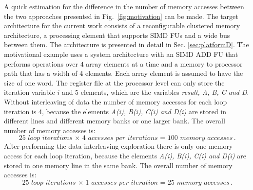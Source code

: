A quick estimation for the difference in the number of memory accesses between the two approaches presented in Fig.~\ref{fig:motivation} can be made.
The target architecture for the current work consists of a reconfigurable clustered memory architecture, a processing element that supports SIMD FUs and a wide bus between them.
The architecture is presented in detail in Sec. \ref{sec:platformD}.
The motivational example uses a system architecture with an SIMD ADD FU that performs operations over 4 array elements at a time and a memory to processor path that has a width of 4 elements. 
Each array element is assumed to have the size of one word.
The register file at the processor level can only store the iteration variable $i$ and 5 elements, which are the variables \textit{result, A, B, C and D}.
Without interleaving of data the number of memory accesses for each loop iteration is 4, because the elements \textit{A(i), B(i), C(i) and D(i)} are stored in different lines and different memory banks or one larger bank.
The overall number of memory accesses is:
	\begin{equation}
		\textit{25 loop iterations $\times$ 4 accesses per iterations = 100 memory accesses}.
	\end{equation}	 
After performing the data interleaving exploration there is only one memory access for each loop iteration, because the elements \textit{A(i), B(i), C(i) and D(i)} are stored in one memory line in the same bank.
The overall number of memory accesses is:
	\begin{equation}
		\textit{25 loop iterations $\times$ 1 accesses per iteration = 25 memory accesses}.
	\end{equation}	 	

